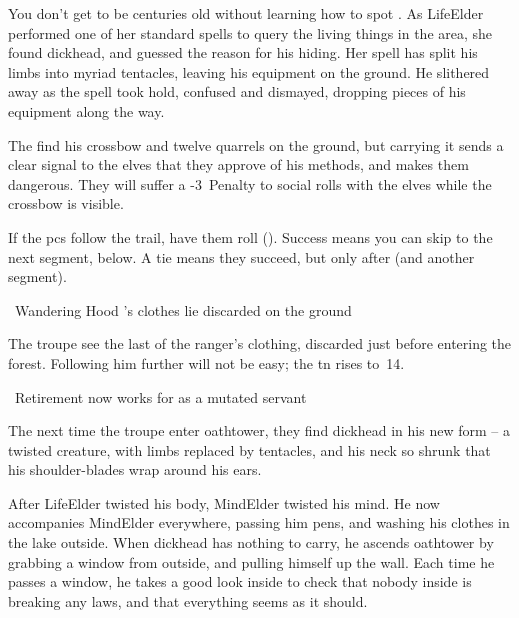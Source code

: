 \begin{exampletext}
  You don't get to be centuries old without learning how to spot .
  As \gls{LifeElder} performed one of her standard spells to query the living things in the area, she found \gls{dickhead}, and guessed the reason for his hiding.
  Her spell has split his limbs into myriad tentacles, leaving his equipment on the ground.
  He slithered away as the spell took hold, confused and dismayed, dropping pieces of his equipment along the way.
\end{exampletext}

The find his \gls{crossbow} and twelve quarrels on the ground, but carrying it sends a clear signal to the elves that they approve of his methods, and makes them dangerous.
They will suffer a -3~Penalty to social rolls with the elves while the \gls{crossbow} is visible.

If the \glspl{pc} follow the trail, have them roll  (\tn[10]).
Success means you can skip to the next \gls{segment}, below.
A tie means they succeed, but only after  (and another \gls{segment}).

{\squash~Wandering Hood}%
{'s clothes lie discarded on the ground}%

The troupe see the last of the ranger's clothing, discarded just before entering the forest.
Following him further will not be easy; the \gls{tn} rises to~14.

{\squash~Retirement}%
{ now works for  as a mutated servant}%

The next time the troupe enter \gls{oathtower}, they find \gls{dickhead} in his new form -- a twisted creature, with limbs replaced by tentacles, and his neck so shrunk that his shoulder-blades wrap around his ears.

After \gls{LifeElder} twisted his body, \gls{MindElder} twisted his mind.
He now accompanies \gls{MindElder} everywhere, passing him pens, and washing his clothes in the lake outside.
When \gls{dickhead} has nothing to carry, he ascends \gls{oathtower} by grabbing a window from outside, and pulling himself up the wall.
Each time he passes a window, he takes a good look inside to check that nobody inside is breaking any laws, and that everything seems as it should.


\dickheadReborn

